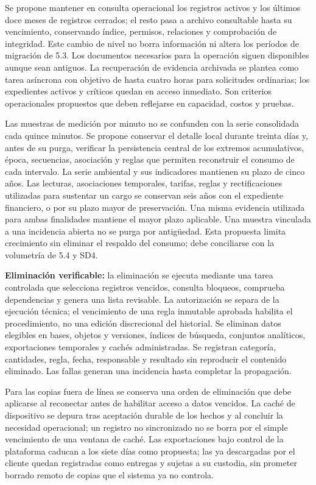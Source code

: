 Se propone mantener en consulta operacional los registros activos y los últimos doce meses de registros cerrados; el resto pasa a archivo consultable hasta su vencimiento, conservando índice, permisos, relaciones y comprobación de integridad. Este cambio de nivel no borra información ni altera los períodos de migración de 5.3. Los documentos necesarios para la operación siguen disponibles aunque sean antiguos. La recuperación de evidencia archivada se plantea como tarea asíncrona con objetivo de hasta cuatro horas para solicitudes ordinarias; los expedientes activos y críticos quedan en acceso inmediato. Son criterios operacionales propuestos que deben reflejarse en capacidad, costos y pruebas.

Las muestras de medición por minuto no se confunden con la serie consolidada cada quince minutos. Se propone conservar el detalle local durante treinta días y, antes de su purga, verificar la persistencia central de los extremos acumulativos, época, secuencias, asociación y reglas que permiten reconstruir el consumo de cada intervalo. La serie ambiental y sus indicadores mantienen su plazo de cinco años. Las lecturas, asociaciones temporales, tarifas, reglas y rectificaciones utilizadas para sustentar un cargo se conservan seis años con el expediente financiero, o por su plazo mayor de preservación. Una misma evidencia utilizada para ambas finalidades mantiene el mayor plazo aplicable. Una muestra vinculada a una incidencia abierta no se purga por antigüedad. Esta propuesta limita crecimiento sin eliminar el respaldo del consumo; debe conciliarse con la volumetría de 5.4 y SD4.

\textbf{Eliminación verificable:} la eliminación se ejecuta mediante una tarea controlada que selecciona registros vencidos, consulta bloqueos, comprueba dependencias y genera una lista revisable. La autorización se separa de la ejecución técnica; el vencimiento de una regla inmutable aprobada habilita el procedimiento, no una edición discrecional del historial. Se eliminan datos elegibles en bases, objetos y versiones, índices de búsqueda, conjuntos analíticos, exportaciones temporales y cachés administradas. Se registran categoría, cantidades, regla, fecha, responsable y resultado sin reproducir el contenido eliminado. Las fallas generan una incidencia hasta completar la propagación.

Para las copias fuera de línea se conserva una orden de eliminación que debe aplicarse al reconectar antes de habilitar acceso a datos vencidos. La caché de dispositivo se depura tras aceptación durable de los hechos y al concluir la necesidad operacional; un registro no sincronizado no se borra por el simple vencimiento de una ventana de caché. Las exportaciones bajo control de la plataforma caducan a los siete días como propuesta; las ya descargadas por el cliente quedan registradas como entregas y sujetas a su custodia, sin prometer borrado remoto de copias que el sistema ya no controla.

